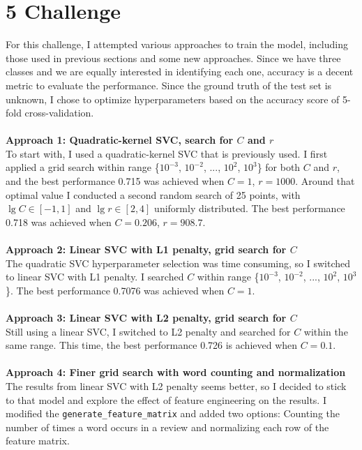 \documentclass{article}
\begin{document}
\section*{5 Challenge}
\indent For this challenge, I attempted various approaches to train the model,
including those used in previous sections and some new approaches.
Since we have three classes and we are equally interested in identifying each one,
accuracy is a decent metric to evaluate the performance.
Since the ground truth of the test set is unknown,
I chose to optimize hyperparameters based on the accuracy score of 5-fold cross-validation.\\\\
\textbf{Approach 1: Quadratic-kernel SVC, search for $C$ and $r$}\\
\indent To start with, I used a quadratic-kernel SVC that is previously used.
I first applied a grid search within range
\{$10^{-3}$, $10^{-2}$, ..., $10^2$, $10^3$\} for both $C$ and $r$,
and the best performance 0.715 was achieved when $C=1$, $r=1000$.
Around that optimal value I conducted a second random search of 25 points,
with $\lg C \in [-1,1]$ and $\lg r \in [2,4]$ uniformly distributed.
The best performance 0.718 was achieved when $C=0.206$, $r=908.7$.\\\\
\textbf{Approach 2: Linear SVC with L1 penalty, grid search for $C$}\\
\indent The quadratic SVC hyperparameter selection was time consuming, so I switched to linear SVC with L1 penalty.
I searched $C$ within range \{$10^{-3}$, $10^{-2}$, ..., $10^2$, $10^3$\}.
The best performance 0.7076 was achieved when $C=1$.\\\\
\textbf{Approach 3: Linear SVC with L2 penalty, grid search for $C$}\\
\indent Still using a linear SVC, I switched to L2 penalty and searched for $C$
within the same range. This time, the best performance 0.726 is achieved when $C=0.1$.\\\\
\textbf{Approach 4: Finer grid search with word counting and normalization}\\
\indent The results from linear SVC with L2 penalty seems better,
so I decided to stick to that model and explore the effect of feature engineering on the results. I modified the \texttt{generate\_feature\_matrix}
and added two options: Counting the number of times a word occurs in a review
and normalizing each row of the feature matrix.
\end{document}
